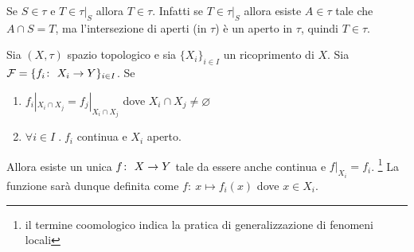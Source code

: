 \begin{remark}
	Se $S \in \tau$ e $T \in \tau|_S$ allora $T \in \tau$. Infatti se $T \in \tau|_S$ allora esiste $A \in \tau$ tale che $A \cap S = T$, ma l'intersezione di aperti (in $\tau$) è un aperto in $\tau$, quindi $T \in \tau$.
\end{remark}

\begin{theorem}
	Sia $(X,\tau)$ spazio topologico e sia $\{X_i\}_{i \in I}$ un ricoprimento di $X$. Sia $\mathcal{F} = \{ f_i \colon\ X_i \rightarrow Y\}_{i \in I}$. Se 
	\begin{enumerate}
		\item $f_i|_{X_i \cap X_j} = f_j|_{X_i \cap X_j}$ dove $X_i \cap X_j \neq \varnothing$
		\item $\forall i \in I \; . \; f_i$ continua e $X_i$ aperto.
	\end{enumerate}
	Allora esiste un unica $f \colon\ X \rightarrow Y$ tale da essere anche continua e $f|_{X_i} = f_i$. \footnote{il termine coomologico indica la pratica di generalizzazione di fenomeni locali}
	La funzione sarà dunque definita come $f \colon\ x \mapsto f_i(x)$ dove $x \in X_i$.
\end{theorem}
